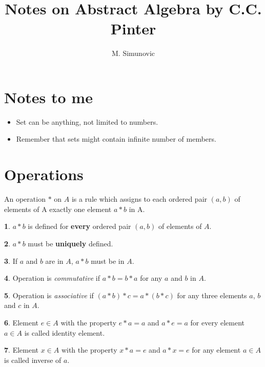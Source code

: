 \documentclass[a4paper,12pt]{article}
\title{Notes on Abstract Algebra by C.C. Pinter}
\author{M. Simunovic}
\theoremstyle{definition}
\newtheorem{definition}{}[section]
\theoremstyle{axiom}
\theoremstyle{theorem}
\begin{document}
\maketitle

\section{Notes to me}
\begin{itemize}
        \item Set can be anything, not limited to numbers.
        \item Remember that sets might contain infinite number of members.
\end{itemize}
\section{Operations}
An operation $*$ on $A$ is a rule which assigns to each ordered pair $(a,b)$ of elements of A exactly one element $a * b$ in A.
\begin{definition}{}
        \textnormal{$a * b$ is defined for \textbf{every} ordered pair $(a, b)$ of elements of $A$.}
\end{definition}
\begin{definition}{}
        \textnormal{$a * b$ must be \textbf{uniquely} defined.}
\end{definition}
\begin{definition}{}
        \textnormal{If $a$ and $b$ are in $A$, $a * b$ must be in $A$.}
\end{definition}
\begin{definition}{}
        \textnormal{Operation is \textit{commutative} if $a * b = b * a$ for any $a$ and $b$ in $A$.}
\end{definition}
\begin{definition}{}
        \textnormal{Operation is \textit{associative} if $(a * b) * c = a * (b * c)$ for any three elements $a$, $b$ and $c$ in $A$.}
\end{definition}
\begin{definition}{}
        Element $e \in A$ with the property $e * a = a$ and $a * e = a$ for every element $a \in A$  is called identity element.
\end{definition}
\begin{definition}{}
        \textnormal{Element $x \in A$ with the property $x * a = e$ and $a * x = e$ for any element $a \in A$ is called inverse of $a$.}
\end{definition}
\end{document}
